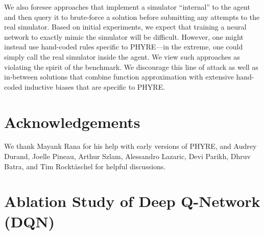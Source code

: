\documentclass{article}
\begin{document}
We also foresee approaches that implement a simulator ``internal'' to the agent and then query it to brute-force a solution before submitting any attempts to the real simulator. Based on initial experiments, we expect that training a neural network to exactly mimic the simulator will be difficult. However, one might instead use hand-coded rules specific to PHYRE---in the extreme, one could simply call the real simulator inside the agent. We view such approaches as violating the spirit of the benchmark.  We discourage this line of attack as well as in-between solutions that combine function approximation with extensive hand-coded inductive biases that are specific to PHYRE.
 
\section*{Acknowledgements}
We thank Mayank Rana for his help with early versions of PHYRE, and Audrey Durand, Joelle Pineau, Arthur Szlam, Alessandro Lazaric, Devi Parikh, Dhruv Batra, and Tim Rockt{\"a}schel for helpful discussions.




\newpage
\appendix


\section{Ablation Study of Deep Q-Network (DQN)}
\end{document}
